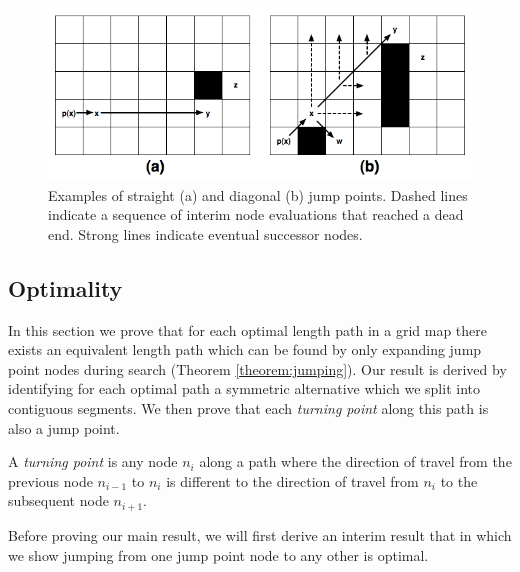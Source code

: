 \begin{figure}[tb]
       \begin{center}
		   \includegraphics[scale=0.35, trim = 10mm 10mm 10mm 0mm]
			{diagrams/jumppoints.png}
       \end{center}
	\vspace{-3pt}
       \caption{Examples of straight (a) and diagonal (b) jump points.
Dashed lines indicate a sequence of interim node evaluations that reached
a dead end. Strong lines indicate eventual successor nodes.}
       \label{fig:jumppoints}
\end{figure}

\subsection{Optimality}
In this section we prove that for each optimal length path in a grid map there
exists an equivalent length path which can be found by only expanding jump
point nodes during search (Theorem \ref{theorem:jumping}).  Our result is
derived by identifying for each optimal path a symmetric alternative which we
split into contiguous segments. We then prove that each \emph{turning point}
along this path is also a jump point.

\begin{definition}
\label{def:turningpoint}
A \emph{turning point} is any node $n_{i}$ along a path where the direction of
travel from the previous node $n_{i-1}$ to $n_{i}$ is different to the direction
of travel from $n_{i}$ to the subsequent node $n_{i+1}$.
\end{definition}

Before proving our main result, we will first derive an interim result that
in which we show jumping from one jump point node to any other is optimal.

